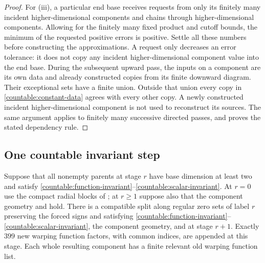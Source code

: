 \begin{proof}
For (iii), a particular end base receives requests from only its finitely
many incident higher-dimensional components and chains through higher-dimensional components. Allowing for the finitely many fixed
product and cutoff bounds, the minimum of the requested positive
errors is positive. Settle all these numbers before constructing the
approximations. A request only decreases an error tolerance: it does
not copy any incident higher-dimensional component value into the end base. During the subsequent upward
pass, the inputs on a component are its own data and already constructed
copies from its finite downward diagram. Their exceptional sets have
a finite union. Outside that union every copy in
\eqref{countable:constant-data} agrees with every other copy. A newly
constructed incident higher-dimensional component is not used to reconstruct its sources. The same
argument applies to finitely many successive directed passes, and
proves the stated dependency rule.
\end{proof}

\subsection{One countable invariant step}

\begin{proposition}\label{countable:step}
Suppose that all nonempty parents at stage $r$ have base dimension at
least two and satisfy \eqref{countable:function-invariant}--\eqref{countable:scalar-invariant}.
At $r=0$ use the compact radial blocks of ; at
$r\ge1$ suppose also that the component geometry and
 hold. There is a compatible split along regular zero sets of label $r$ preserving the
forced signs and satisfying
\eqref{countable:function-invariant}--\eqref{countable:scalar-invariant},
the component geometry, and  at stage $r+1$. Exactly $399$ new warping function factors, with
common indices, are appended at this stage. Each whole resulting
component has a finite relevant old warping function list.
\end{proposition}

